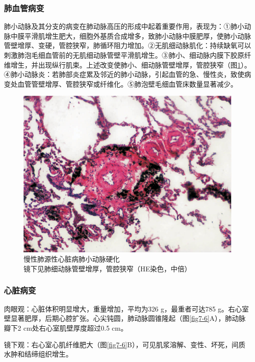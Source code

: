 \subsubsection{肺血管病变}

肺小动脉及其分支的病变在肺动脉高压的形成中起着重要作用，表现为：①肺小动脉中膜平滑肌增生肥大，细胞外基质合成增多，致肺小动脉中膜肥厚，使肺小动脉管壁增厚、变硬，管腔狭窄，肺循环阻力增加。②无肌细动脉肌化：持续缺氧可以刺激肺泡毛细血管前的无肌细动脉管壁平滑肌增生。③肺小、细动脉内膜下胶原纤维增生，并出现纵行肌束。上述改变使肺小、细动脉管壁增厚，管腔狭窄（图\ref{fig7-5}）。④肺小动脉炎：若肺部炎症累及邻近的肺小动脉，引起血管的急、慢性炎，致使病变处血管管壁增厚、管腔狭窄或纤维化。⑤肺泡壁毛细血管床数量显著减少。

\begin{figure}[!htbp]
 \centering
 \includegraphics{./images/Image00114.jpg}
 \captionsetup{justification=centering}
 \caption{慢性肺源性心脏病肺小动脉硬化\\ {\small 镜下见肺细动脉管壁增厚，管腔狭窄（HE染色，中倍）}}
\label{fig7-5}
  \end{figure}

\subsubsection{心脏病变}

肉眼观：心脏体积明显增大，重量增加，平均为326 g，最重者可达785
g。右心室壁显著肥厚，后期心腔扩张。心尖钝圆，肺动脉圆锥隆起（图\ref{fig7-6}A），肺动脉瓣下2
cm处右心室肌壁厚度超过0.5 cm。

镜下观：右心室心肌纤维肥大（图\ref{fig7-6}B），可见肌浆溶解、变性、坏死，间质水肿和结缔组织增生。


